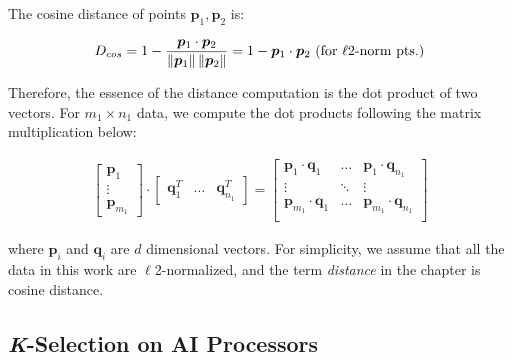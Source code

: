 The cosine distance of points $\boldsymbol{p}_{1}, \boldsymbol{p}_{2}$ is:

\begin{equation}
    \label{eq:cosine}
    \begin{aligned}
    D_{cos} = 1 - \frac{\boldsymbol{p}_{1} \cdot \boldsymbol{p}_{2}}
            {\left\| \boldsymbol{p}_{1} \right\| 
                \left\| \boldsymbol{p}_{2} \right\|}
        = 1 - \boldsymbol{p}_{1} \cdot \boldsymbol{p}_{2}\  (\textnormal{for } \ell\textnormal{2-norm pts.})
    \end{aligned}
    \end{equation}

Therefore, the essence of the distance computation is the dot product of two vectors. For $m_1 \times n_1$ data, we compute the dot products following the matrix multiplication below:

\begin{equation}
    \label{eq:dot_products}
    \begin{aligned}
    \begin{bmatrix} 
        \boldsymbol{p}_{1} \\
        \vdots \\
        \boldsymbol{p}_{m_1}
    \end{bmatrix}
    \cdot
    \begin{bmatrix} 
        \boldsymbol{q}_{1}^{T} &
        \dots &
        \boldsymbol{q}_{n_1}^{T}
    \end{bmatrix}
    =
    \begin{bmatrix} 
        \boldsymbol{p}_{1} \cdot \boldsymbol{q}_{1} &
        \dots &
        \boldsymbol{p}_{1} \cdot \boldsymbol{q}_{n_1} \\
        \vdots & \ddots & \vdots \\
        \boldsymbol{p}_{m_1} \cdot \boldsymbol{q}_{1} &
        \dots &
        \boldsymbol{p}_{m_1} \cdot \boldsymbol{q}_{n_1} \\
    \end{bmatrix}
    \end{aligned}
    \end{equation}

where $\boldsymbol{p}_{i}$ and $\boldsymbol{q}_{i}$ are $d$ dimensional vectors. For simplicity, we assume that all the data in this work are $\ell$2-normalized, and the term \textit{distance} in the chapter is cosine distance.

\subsection{\textit{K}-Selection on AI Processors}

